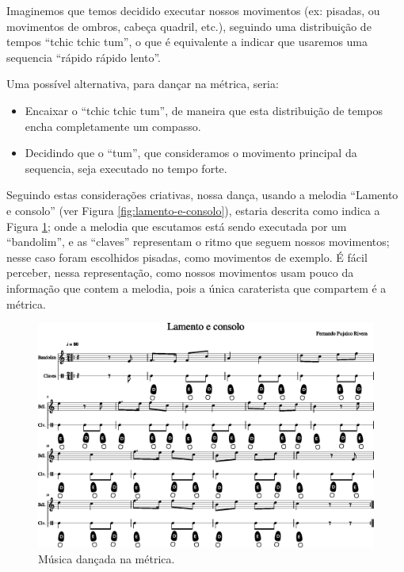 \begin{example}
\label{ex:dance:pulso}
Imaginemos que temos decidido executar nossos movimentos (ex: pisadas, ou movimentos de ombros, cabeça quadril, etc.),
seguindo uma distribuição de tempos ``tchic tchic tum'',
o que é equivalente a indicar que usaremos uma sequencia ``rápido rápido lento''.

Uma possível alternativa, para dançar na métrica, 
seria:
\begin{itemize} 
\item Encaixar o ``tchic tchic tum'', 
de maneira que esta distribuição de tempos encha completamente um compasso.
\item Decidindo  que o ``tum'', 
que consideramos o movimento principal da sequencia,
seja executado no tempo forte.
\end{itemize}

Seguindo estas considerações criativas,
nossa dança, 
usando a melodia ``Lamento e consolo'' (ver Figura \ref{fig:lamento-e-consolo}), 
estaria descrita como indica a Figura \ref{fig:lamentoconsolopulso1};
onde a melodia que escutamos está sendo executada por um ``bandolim'',
e as ``claves'' representam o ritmo que seguem nossos movimentos;
nesse caso foram escolhidos pisadas, como movimentos de exemplo.
É fácil perceber, nessa representação, 
como nossos movimentos usam pouco da informação que contem a melodia, 
pois a única caraterista que compartem é a métrica.
\end{example}
\begin{figure}
    \centering
    \includegraphics[width=\textwidth]{chapters/cap-musicalidade-tecnica/lamento-e-consolo-clave-pulso-1.eps}
    \caption{Música dançada na métrica.}
    \label{fig:lamentoconsolopulso1}
\end{figure}

